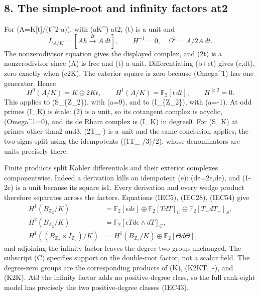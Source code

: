 \documentclass[
]{article}
\begin{document}
\subsection{8. The simple-root and infinity factors
at2}\label{the-simple-root-and-infinity-factors-at2}

For (A=K{[}t{]}/(t\^{}2-a)), with (a\in K\^{}\times) at2, (t) is a unit
and \[
L_{A/K}=[A\bar h\xrightarrow{2t}A\,dt],\qquad
H^{-1}=0,\quad\Omega^1=A/2A\,dt.
\tag{IEC53}
\] The nonzerodivisor equation gives the displayed complex, and (2t) is
a nonzerodivisor since (A) is free and (t) a unit. Differentiating
(b+ct) gives (c,dt), zero exactly when (c\in2K). The exterior square is
zero because (Omega\^{}1) has one generator. Hence \[
H^0(A/K)=K\oplus2Kt,\qquad
H^1(A/K)=\mathbb F_2[t\,dt],\qquad H^{\ge2}=0.
\tag{IEC54}
\] This applies to (S\_\{\mathbb Z\_2\}), with (a=9), and to
(I\_\{\mathbb Z\_2\}), with (a=-1). At odd primes (I\_K) is étale:
(2\Theta) is a unit, so its cotangent complex is acyclic,
(Omega\^{}1=0), and its de Rham complex is (I\_K) in degree0. For (S\_K)
at primes other than2 and3, (2T\_-) is a unit and the same conclusion
applies; the two signs split using the idempotents ((1\pm T\_-/3)/2),
whose denominators are units precisely there.

Finite products split Kähler differentials and their exterior complexes
componentwise. Indeed a derivation kills an idempotent (e): (de=2e,de),
and (1-2e) is a unit because its square is1. Every derivation and every
wedge product therefore separates across the factors. Equations (IEC5),
(IEC28), (IEC54) give \[
\begin{aligned}
H^1(B_{\mathbb Z_2}/K)&=\mathbb F_2[\epsilon d\epsilon]
\oplus\mathbb F_2[TdT]_C\oplus\mathbb F_2[T_-dT_-]_S,\\
H^2(B_{\mathbb Z_2}/K)&=\mathbb F_2[\epsilon T d\epsilon\wedge dT]_C,\\
H^1((B_{\mathbb Z_2}\times I_{\mathbb Z_2})/K)
&=H^1(B_{\mathbb Z_2}/K)\oplus\mathbb F_2[\Theta d\Theta],
\end{aligned}
\tag{IEC55}
\] and adjoining the infinity factor leaves the degree-two group
unchanged. The subscript (C) specifies support on the double-root
factor, not a scalar field. The degree-zero groups are the corresponding
products of (K), (K\oplus2KT\_-), and (K\oplus2K\Theta). At3 the
infinity factor adds no positive-degree class, so the full rank-eight
model has precisely the two positive-degree classes (IEC43).
\end{document}
